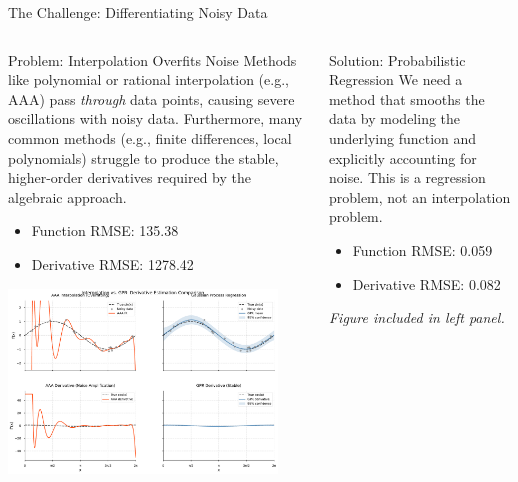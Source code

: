 \documentclass[aspectratio=169]{beamer}
\begin{document}
\begin{frame}[shrink]{The Challenge: Differentiating Noisy Data}
  \begin{columns}[t]
    \begin{column}{0.48\textwidth}
      \begin{block}{Problem: Interpolation Overfits Noise}
        \tiny
        Methods like polynomial or rational interpolation (e.g., AAA) pass \textit{through} data points, causing severe oscillations with noisy data. Furthermore, many common methods (e.g., finite differences, local polynomials) struggle to produce the stable, higher-order derivatives required by the algebraic approach.
        \begin{itemize}
            \item Function RMSE: 135.38
            \item Derivative RMSE: 1278.42
        \end{itemize}
      \end{block}
      \begin{center}
        \includegraphics[width=0.9\textwidth]{gpr_vs_aaa_comparison.pdf}
      \end{center}
    \end{column}
    \begin{column}{0.48\textwidth}
      \begin{block}{Solution: Probabilistic Regression}
          \tiny
          We need a method that smooths the data by modeling the underlying function and explicitly accounting for noise. This is a regression problem, not an interpolation problem.
          \begin{itemize}
            \item Function RMSE: 0.059
            \item Derivative RMSE: 0.082
        \end{itemize}
      \end{block}
      \begin{center}
        \textit{Figure included in left panel.}
      \end{center}
    \end{column}
  \end{columns}
\end{frame}
\end{document}
